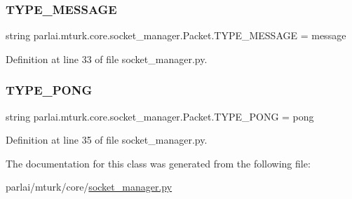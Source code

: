 \subsubsection{\texorpdfstring{T\+Y\+P\+E\+\_\+\+M\+E\+S\+S\+A\+GE}{TYPE\_MESSAGE}}
{\footnotesize\ttfamily string parlai.\+mturk.\+core.\+socket\+\_\+manager.\+Packet.\+T\+Y\+P\+E\+\_\+\+M\+E\+S\+S\+A\+GE = \textquotesingle{}message\textquotesingle{}\hspace{0.3cm}{\ttfamily [static]}}



Definition at line 33 of file socket\+\_\+manager.\+py.

\mbox{\label{classparlai_1_1mturk_1_1core_1_1socket__manager_1_1Packet_a330a38900fd99488002a5bc9d245ed52}} 
\subsubsection{\texorpdfstring{T\+Y\+P\+E\+\_\+\+P\+O\+NG}{TYPE\_PONG}}
{\footnotesize\ttfamily string parlai.\+mturk.\+core.\+socket\+\_\+manager.\+Packet.\+T\+Y\+P\+E\+\_\+\+P\+O\+NG = \textquotesingle{}pong\textquotesingle{}\hspace{0.3cm}{\ttfamily [static]}}



Definition at line 35 of file socket\+\_\+manager.\+py.



The documentation for this class was generated from the following file\+:\begin{DoxyCompactItemize}
\item 
parlai/mturk/core/\hyperlink{socket__manager_8py}{socket\+\_\+manager.\+py}\end{DoxyCompactItemize}
